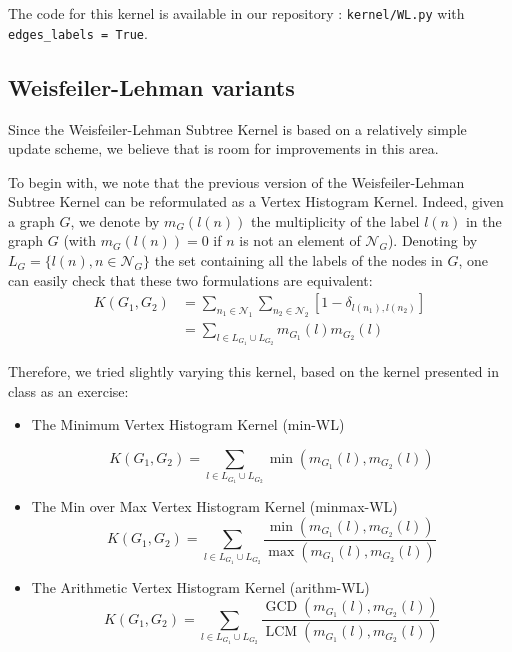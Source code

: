 \documentclass{IEEEtran}
\begin{document}
The code for this kernel is available in our repository : \texttt{kernel/WL.py}
with \texttt{edges\_labels = True}.

\subsection{Weisfeiler-Lehman variants}
Since the Weisfeiler-Lehman Subtree Kernel is based on a relatively simple update scheme,
we believe that is room for improvements in this area.

To begin with, we note that the previous version of the Weisfeiler-Lehman Subtree Kernel can be reformulated
as a Vertex Histogram Kernel. Indeed,
given a graph $G$, we denote by $m_G(l(n))$ the multiplicity of
the label $l(n)$ in the graph $G$ (with $m_G(l(n)) = 0$ if $n$ is not an
element of $\mathcal N_G$). Denoting by $L_G = \{l(n), n \in \mathcal N_G\}$
the set containing all the labels of the nodes in $G$,
one can easily check that these two formulations are equivalent:
\begin{equation*}
    \begin{split}
        K(G_1, G_2) & = \sum_{n_1 \in \mathcal{N}_1} \sum_{n_2 \in \mathcal{N}_2} [1 - \delta_{l(n_1), l(n_2)}]\\
        &= \sum_{l \in L_{G_1} \cup L_{G_2}} m_{G_1}(l)m_{G_2}(l)
    \end{split}
\end{equation*}

Therefore, we tried slightly varying this kernel, based on the kernel presented in class as an exercise:

\begin{itemize}
    \item The Minimum Vertex Histogram Kernel (min-WL)

          \begin{equation*}
              K(G_1, G_2) = \sum_{l \in L_{G_1} \cup L_{G_2}} \operatorname*{min}(m_{G_1}(l), m_{G_2}(l))
          \end{equation*}

    \item The Min over Max Vertex Histogram Kernel (minmax-WL)
          \begin{equation*}
              K(G_1, G_2) = \sum_{l \in L_{G_1} \cup L_{G_2}} \frac{\operatorname*{min}(m_{G_1}(l), m_{G_2}(l))}{\operatorname*{max}(m_{G_1}(l), m_{G_2}(l))}
          \end{equation*}
    \item The Arithmetic Vertex Histogram Kernel (arithm-WL)
          \begin{equation*}
              K(G_1, G_2) = \sum_{l \in L_{G_1} \cup L_{G_2}} \frac{\operatorname*{GCD}(m_{G_1}(l), m_{G_2}(l))}{\operatorname*{LCM}(m_{G_1}(l), m_{G_2}(l))}
          \end{equation*}
\end{itemize}
\end{document}

